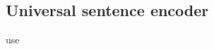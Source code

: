 \subsection{Universal sentence encoder}\label{subsec:univ-sent-encoder}
\ac{use}
\cite{UniversalSentEnc2018}